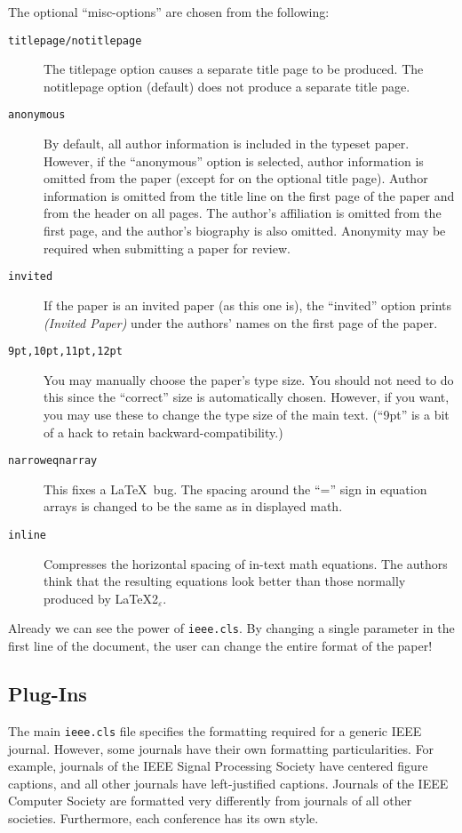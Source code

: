 \documentclass[%
	final,
	reprint,
	notitlepage,
	narroweqnarray,
	inline,
	twoside,
        invited,
	]{ieee}
\newcommand{\latexiie}{\LaTeX2{\Large$_\varepsilon$}}
\begin{document}
The optional ``misc-options'' are chosen from the following:
\begin{description}
\item[\texttt{titlepage/notitlepage}] The titlepage option causes a
    separate title page to be produced. The notitlepage option 
    (default) does not produce a separate title page.
\item[\texttt{anonymous}] By default, all author information is included
    in the typeset paper.
    However, if the ``anonymous'' option is selected, author information
    is omitted from the paper (except for on the optional title page).
    Author information is omitted from the title line on the first
    page of the paper and from the header on all pages. The author's
    affiliation is omitted from the first page, and the author's 
    biography is also omitted. Anonymity may be required when
    submitting a paper for review.
\item[\texttt{invited}] If the paper is an invited paper (as this
    one is), the ``invited'' option prints \emph{(Invited Paper)} under the 
    authors' names on the first page of the paper.
\item[\texttt{9pt,10pt,11pt,12pt}] You may manually choose the paper's 
    type size.
    You should not need to do this since the ``correct'' size is
    automatically chosen. However, if you want, you may use these to
    change the type size of the main text. (``9pt'' is a bit of a hack
    to retain backward-compatibility.)
\item[\texttt{narroweqnarray}] This fixes a \LaTeX\ bug. The
    spacing around the ``='' sign in equation arrays is changed 
    to be the same as in displayed math.  
\item[\texttt{inline}] Compresses the horizontal spacing of in-text
    math equations. The authors think that the resulting equations
    look better than those normally produced by \latexiie.
\end{description}

Already we can see the power of \texttt{ieee.cls}. By changing a
single parameter in the first line of the document, the user can
change the entire format of the paper!

\subsection{Plug-Ins}

The main \texttt{ieee.cls} file specifies the formatting required for
a generic IEEE journal. However, some journals have their own
formatting particularities. For example, journals of the IEEE Signal
Processing Society have centered figure captions, and all other
journals have left-justified captions. Journals of the IEEE Computer
Society are formatted very differently from journals of all other
societies. Furthermore, each conference has its own style.
\end{document}
